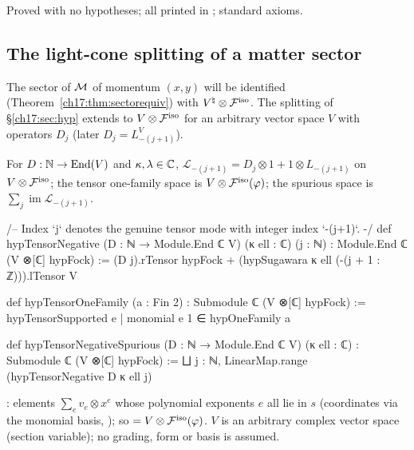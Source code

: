 \begin{status}
Proved with no hypotheses; all printed in ; standard axioms.
\end{status}

\subsection{The light-cone splitting of a matter sector}

The sector of $\mathcal{M}$ of momentum $(x,y)$ will be identified (Theorem~\ref{ch17:thm:sectorequiv}) with
${V^{\natural}}\otimes\mathcal{F}^{\mathrm{iso}}$.  The splitting of \S\ref{ch17:sec:hyp} extends to $V\otimes\mathcal{F}^{\mathrm{iso}}$ for an
arbitrary vector space $V$ with operators $D_j$ (later $D_j=L^V_{-(j+1)}$).

\begin{definition}\label{ch17:def:tensornegative}
For $D:{\mathbb{N}}\to\operatorname{End}(V)$ and $\kappa,\lambda\in{\mathbb{C}}$, $\mathcal L_{-(j+1)}=D_j\otimes1+1\otimes L_{-(j+1)}$ on $V\otimes\mathcal{F}^{\mathrm{iso}}$; the
tensor one-family space is $V\otimes\mathcal{F}^{\mathrm{iso}}(\varphi)$; the spurious space is $\sum_j\operatorname{im}\mathcal L_{-(j+1)}$.
\end{definition}

\begin{leancode}
/-- Index `j` denotes the genuine tensor mode with integer index `-(j+1)`. -/
def hypTensorNegative (D : ℕ → Module.End ℂ V) (κ ell : ℂ) (j : ℕ) :
    Module.End ℂ (V ⊗[ℂ] hypFock) :=
  (D j).rTensor hypFock + (hypSugawara κ ell (-(j + 1 : ℤ))).lTensor V

def hypTensorOneFamily (a : Fin 2) : Submodule ℂ (V ⊗[ℂ] hypFock) :=
  hypTensorSupported {e | monomial e 1 ∈ hypOneFamily a}

def hypTensorNegativeSpurious (D : ℕ → Module.End ℂ V) (κ ell : ℂ) :
    Submodule ℂ (V ⊗[ℂ] hypFock) := ⨆ j : ℕ, LinearMap.range (hypTensorNegative D κ ell j)
\end{leancode}

\begin{dictionary}
: elements $\sum_ev_e\otimes x^e$ whose polynomial exponents $e$ all lie in $s$ (coordinates via
the monomial basis, ); so  $=V\otimes\mathcal{F}^{\mathrm{iso}}(\varphi)$.  $V$ is an
arbitrary complex vector space (section variable); no grading, form or basis is assumed.
\end{dictionary}

